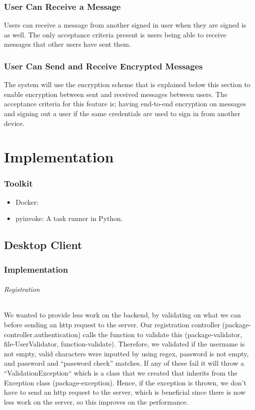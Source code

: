 \documentclass[11pt,a4paper]{report}
\begin{document}
\subsection{User Can Receive a Message}
Users can receive a message from another signed in user when they are signed is as well. The only acceptance criteria present is users being able to receive messages that other users have sent them.
\subsection{User Can Send and Receive Encrypted Messages}
The system will use the encryption scheme that is explained below this section to enable encryption between sent and received messages between users. The acceptance criteria for this feature is; having end-to-end encryption on messages and signing out a user if the same credentials are used to sign in from another device.

\chapter{Implementation}

\subsection{Toolkit}

\begin{itemize}
  \item Docker:
  \item pyinvoke: A task runner in Python.
\end{itemize}

\section{Desktop Client}

\subsection{Implementation}

\subparagraph{Registration}
We wanted to provide less work on the backend, by validating on what we can before sending an http request to the server. Our registration controller (package-controller.authentication) calls the function to validate this (package-validator, file-UserValidator, function-validate). Therefore, we validated if the username is not empty, valid characters were inputted by using regex, password is not empty, and password and “password check” matches. If any of these fail it will throw a “ValidationException“ which is a class that we created that inherits from the Exception class (package-exception). Hence, if the exception is thrown, we don’t have to send an http request to the server, which is beneficial since there is now less work on the server, so this improves on the performance.
\end{document}
